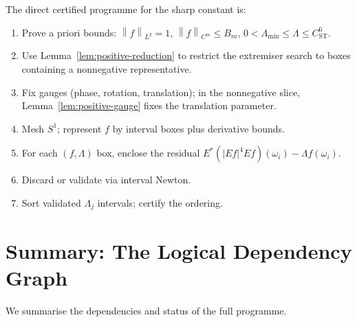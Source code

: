 \documentclass[12pt]{article}
\theoremstyle{definition}
\theoremstyle{remark}
\newcommand{\norm}[1]{\left\|#1\right\|}
\begin{document}
The direct certified programme for the sharp constant is:
\begin{enumerate}[leftmargin=2em]
  \item Prove a priori bounds:
    $\norm{f}_{L^2}=1$, $\norm{f}_{C^m}\leq B_m$,
    $0<\Lambda_{\min}\leq\Lambda\leq C_{\mathrm{ST}}^6$.
  \item Use Lemma~\ref{lem:positive-reduction} to restrict the extremiser
    search to boxes containing a nonnegative representative.
  \item Fix gauges (phase, rotation, translation); in the nonnegative
    slice, Lemma~\ref{lem:positive-gauge} fixes the translation parameter.
  \item Mesh $S^1$; represent $f$ by interval boxes plus derivative bounds.
  \item For each $(f,\Lambda)$ box, enclose the residual
    $E^*(|Ef|^4Ef)(\omega_i)-\Lambda f(\omega_i)$.
  \item Discard or validate via interval Newton.
  \item Sort validated $\Lambda_j$ intervals; certify the ordering.
\end{enumerate}

\section{Summary: The Logical Dependency Graph}
\label{sec:dependency}

We summarise the dependencies and status of the full programme.
\end{document}
